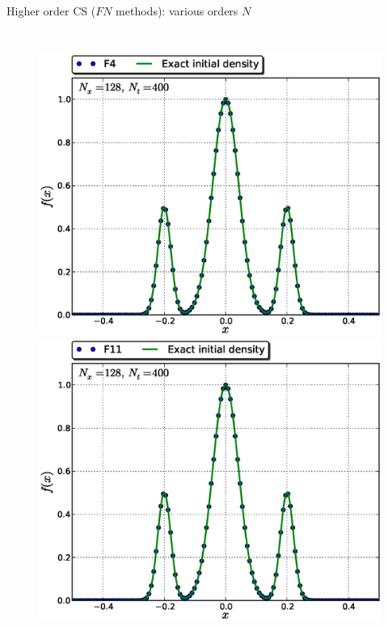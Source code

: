 \documentclass{beamer}
\begin{document}
\begin{frame}{Higher order CS ($FN$ methods): various orders $N$}
\vspace*{-5.5mm}
\begin{columns}
\begin{figure}
\centering
 \includegraphics[width=\textwidth]{graphics/plot_-_GB3_F4__Nx128Nt400_w_f0_itmax}\\ \vspace*{-4mm}
 \includegraphics[width=\textwidth]{graphics/plot_-_GB3_F11__Nx128Nt400_w_f0_itmax}

\end{figure}
\end{columns}
\end{frame}
\end{document}
